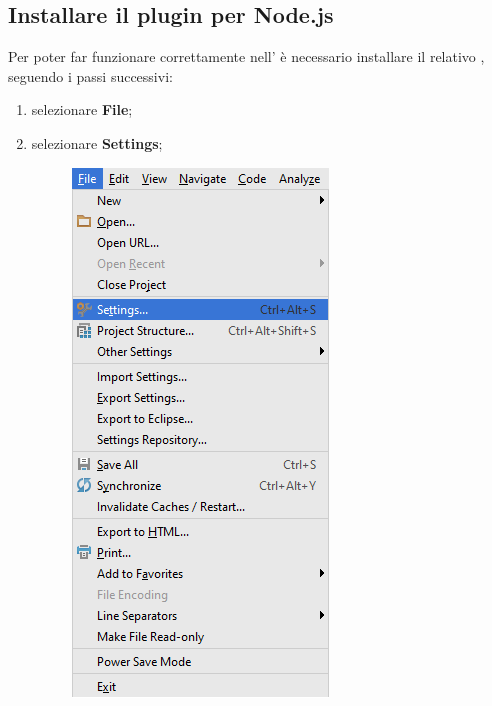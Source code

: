 \documentclass[12pt,a4paper]{article}
\begin{document}
	\subsection{Installare il plugin per Node.js}
	Per poter far funzionare correttamente  nell' è necessario installare il relativo , seguendo i passi successivi:
	\begin{enumerate}
		\item selezionare \textbf{File};
		\item selezionare \textbf{Settings};

		\begin{center}
			\begin{figure}[H]
				\centering \includegraphics[max width=\textwidth]{../img/manualeSviluppatore/settings.png}

\end{figure}
\end{center}
\end{enumerate}
\end{document}
